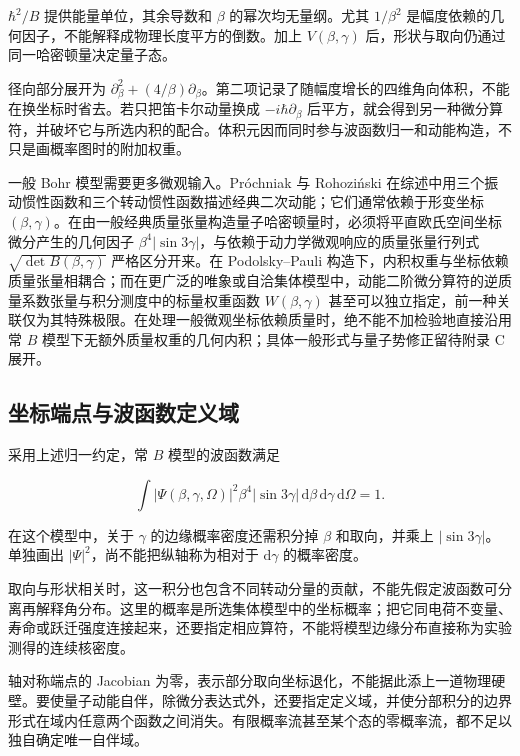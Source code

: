 $\hbar^2/B$ 提供能量单位，其余导数和 $\beta$ 的幂次均无量纲。尤其 $1/\beta^2$ 是幅度依赖的几何因子，不能解释成物理长度平方的倒数。加上 $V(\beta,\gamma)$ 后，形状与取向仍通过同一哈密顿量决定量子态。

径向部分展开为 $\partial_\beta^2+(4/\beta)\partial_\beta$。第二项记录了随幅度增长的四维角向体积，不能在换坐标时省去。若只把笛卡尔动量换成 $-i\hbar\partial_\beta$ 后平方，就会得到另一种微分算符，并破坏它与所选内积的配合。体积元因而同时参与波函数归一和动能构造，不只是画概率图时的附加权重。

一般 Bohr 模型需要更多微观输入。Próchniak 与 Rohoziński 在综述中用三个振动惯性函数和三个转动惯性函数描述经典二次动能；它们通常依赖于形变坐标 $(\beta, \gamma)$。在由一般经典质量张量构造量子哈密顿量时，必须将平直欧氏空间坐标微分产生的几何因子 $\beta^4 |\sin 3\gamma|$，与依赖于动力学微观响应的质量张量行列式 $\sqrt{\det B(\beta, \gamma)}$ 严格区分开来。在 Podolsky–Pauli 构造下，内积权重与坐标依赖质量张量相耦合；而在更广泛的唯象或自洽集体模型中，动能二阶微分算符的逆质量系数张量与积分测度中的标量权重函数 $W(\beta, \gamma)$ 甚至可以独立指定，前一种关联仅为其特殊极限。在处理一般微观坐标依赖质量时，绝不能不加检验地直接沿用常 $B$ 模型下无额外质量权重的几何内积；具体一般形式与量子势修正留待附录 C 展开\cite{prochniak-rohozinski-2009-bohr-collective-hamiltonian}。


\subsection{坐标端点与波函数定义域}\label{sec:2-4-4}


采用上述归一约定，常 $B$ 模型的波函数满足

\begin{equation}\label{eq:2-4-14}
\int|\Psi(\beta,\gamma,\Omega)|^2
\beta^4|\sin3\gamma|\,\mathrm d\beta\,\mathrm d\gamma\,\mathrm d\Omega=1.
\end{equation}

在这个模型中，关于 $\gamma$ 的边缘概率密度还需积分掉 $\beta$ 和取向，并乘上 $|\sin3\gamma|$。单独画出 $|\Psi|^2$，尚不能把纵轴称为相对于 $\mathrm d\gamma$ 的概率密度。

取向与形状相关时，这一积分也包含不同转动分量的贡献，不能先假定波函数可分离再解释角分布。这里的概率是所选集体模型中的坐标概率；把它同电荷不变量、寿命或跃迁强度连接起来，还要指定相应算符，不能将模型边缘分布直接称为实验测得的连续核密度。

轴对称端点的 Jacobian 为零，表示部分取向坐标退化，不能据此添上一道物理硬壁。要使量子动能自伴，除微分表达式外，还要指定定义域，并使分部积分的边界形式在域内任意两个函数之间消失。有限概率流甚至某个态的零概率流，都不足以独自确定唯一自伴域。

